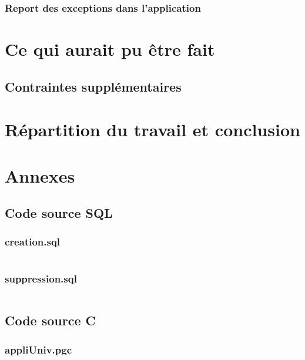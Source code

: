 \documentclass[12pt,titlepage,a4paper]{report}
\begin{document}
			\subsection{Report des exceptions dans l'application}
			

	\chapter{Ce qui aurait pu être fait}
		\section{Contraintes supplémentaires}
		


	\chapter{Répartition du travail et conclusion}
		

	\chapter{Annexes}
		\section{Code source SQL}
			\subsection{creation.sql}
			\inputminted[tabsize=4,linenos,fontsize=\small]{sql}{../src/SQL/creation.sql}

			\subsection{suppression.sql}		
			\inputminted[tabsize=4,linenos,fontsize=\small]{sql}{../src/SQL/suppression.sql}

		\section{Code source C}
			\subsection{appliUniv.pgc}
			\inputminted[tabsize=4,linenos,fontsize=\small]{sql}{../src/C/appliUniv.pgc}
\end{document}
